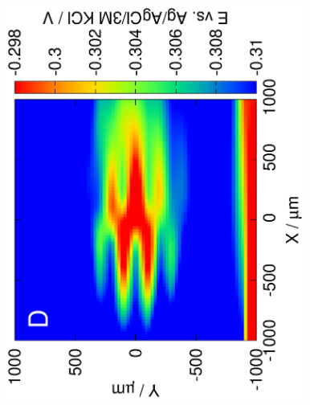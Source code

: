 \documentclass{beamer}
\begin{document}
\begin{frame}
\begin{columns}[T]
\begin{column}{.2\textwidth}
\includegraphics[trim = 10mm 30mm 0mm 10mm, clip, width=0.8\textwidth, angle=-90]{13121316.eps}\\
\end{column}%
\begin{column}{.2\textwidth}
\begin{minipage}[c][0.7\textheight][c]{\linewidth}
\centering
{}
\end{minipage}
\end{column}%
\begin{column}{.2\textwidth}
\centering

\end{column}
\end{columns}
\end{frame}
\end{document}
